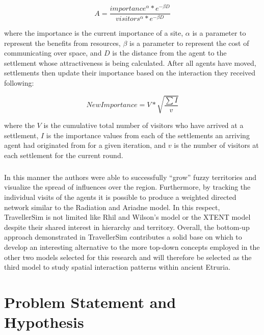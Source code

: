 \documentclass[12pt,a4paper]{thesis}
\begin{document}

		\begin{equation}
	 	A = \frac{importance^{\alpha} * e^{-\beta D}}{visitors^{\alpha} * e^{-\beta D}}
		\label{eq:attractiveness}
		\end{equation}
	
where the importance is the current importance of a site, $\alpha$ is a parameter to represent the benefits from resources, $\beta$ is a parameter to represent the cost of communicating over space, and $D$ is the distance from the agent to the settlement whose attractiveness is being calculated. After all agents have moved, settlements then update their importance based on the interaction they received following:

		\begin{equation}
	 	New Importance = V * \sqrt{\frac{\sum{I}}{v}} 
		\label{eq:importance}
		\end{equation}
 
where the $V$ is the cumulative total number of visitors who have arrived at a settlement, $I$ is the importance values from each of the settlements an arriving agent had originated from for a given iteration, and $v$ is the number of visitors at each settlement for the current round. 

\paragraph{}
In this manner the authors were able to successfully ``grow'' fuzzy territories and visualize the spread of influences over the region. Furthermore, by tracking the individual visits of the agents it is possible to produce a weighted directed network similar to the Radiation and Ariadne model. In this respect, TravellerSim is not limited like Rhil and Wilson's model or the XTENT model despite their shared interest in hierarchy and territory. Overall, the bottom-up approach demonstrated in TravellerSim contributes a solid base on which to develop an interesting alternative to the more top-down concepts employed in the other two models selected for this research and will therefore be selected as the third model to study spatial interaction patterns within ancient Etruria. 

\chapter{Problem Statement and Hypothesis}
\end{document}
